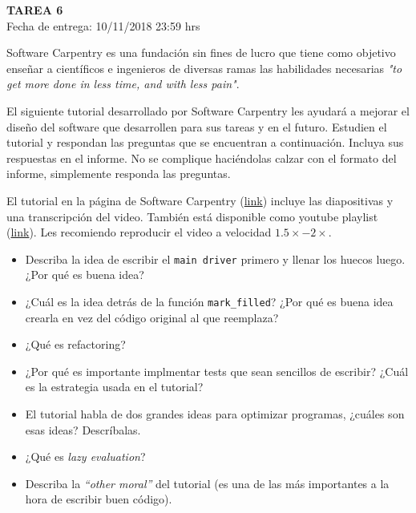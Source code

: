 \documentclass[letter, 11pt]{article}
\newcommand{\tareanro}{6}
\newcommand{\fechaentrega}{10/11/2018 23:59 hrs}
\begin{document}
\thispagestyle{firstpage}

\begin{center}
  {\uppercase{\LARGE \bf Tarea \tareanro}}\\
  Fecha de entrega: \fechaentrega
\end{center}



Software Carpentry es una fundación sin fines de lucro que tiene como objetivo
enseñar a científicos e ingenieros de diversas ramas las habilidades necesarias
\emph{"to get more done in less time, and with less pain"}.

El siguiente tutorial desarrollado por Software Carpentry les ayudará a mejorar
el diseño del software que desarrollen para sus tareas y en el futuro. Estudien
el tutorial y respondan las preguntas que se encuentran a continuación.
Incluya sus respuestas en el informe. No se complique haciéndolas calzar con el
formato del informe, simplemente responda las preguntas.

El tutorial en la página de Software Carpentry
(\href{https://v4.software-carpentry.org/invperc/index.html}{link}) incluye las
diapositivas y una transcripción del video. También está disponible como
youtube playlist
(\href{https://www.youtube.com/playlist?list=PL5859017B018F03F4}{link}). Les
recomiendo reproducir el video a velocidad $1.5\times - 2\times$.

\begin{itemize}

  \item Describa la idea de escribir el \texttt{main driver} primero y llenar
    los huecos luego. ¿Por qué es buena idea?

\item ¿Cuál es la idea detrás de la función \texttt{mark\_filled}? ¿Por qué es
  buena idea crearla en vez del código original al que reemplaza?

\item ¿Qué es refactoring?

\item ¿Por qué es importante implmentar tests que sean sencillos de escribir?
  ¿Cuál es la estrategia usada en el tutorial?

\item El tutorial habla de dos grandes ideas para optimizar programas, ¿cuáles
  son esas ideas? Descríbalas.

\item ¿Qué es \emph{lazy evaluation}?

\item Describa la \emph{``other moral''} del tutorial (es una de las más
  importantes a la hora de escribir buen código).

\end{itemize}
\end{document}
